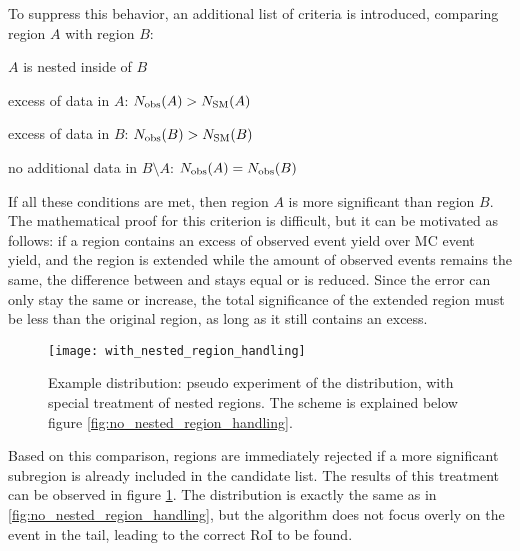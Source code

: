 To suppress this behavior, an additional list of criteria is introduced, comparing region $A$ with region $B$:
\begin{my_list}
	\item $A$ is nested inside of $B$
	\item excess of data in $A$: ${N_\mathrm{obs}}(A) > {N_\mathrm{SM}}(A)$
	\item excess of data in $B$: ${N_\mathrm{obs}}(B) > {N_\mathrm{SM}}(B)$
	\item no additional data in $B \setminus A$: ${N_\mathrm{obs}}(A) = {N_\mathrm{obs}}(B)$
\end{my_list}
If all these conditions are met, then region $A$ is more significant than region $B$.
The mathematical proof for this criterion is difficult, but it can be motivated as follows: if a region contains an excess of observed event yield over MC event yield, and the region is extended while the amount of observed events remains the same, the difference between \Nmc and \Ndata stays equal or is reduced. Since the error \sigmamc can only stay the same or increase, the total significance of the extended region must be less than the original region, as long as it still contains an excess.

\begin{figure}[htb]
	\centering
	\texttt{[image: with\_nested\_region\_handling]}
	\caption{Example distribution: pseudo experiment of the  \sumpT distribution, with special treatment of nested regions. The scheme is explained below figure \ref{fig:no_nested_region_handling}. }
	\label{fig:with_nested_region_handling}
\end{figure}
Based on this comparison, regions are immediately rejected if a more significant subregion is already included in the candidate list. The results of this treatment can be observed in figure \ref{fig:with_nested_region_handling}. The distribution is exactly the same as in \ref{fig:no_nested_region_handling}, but the algorithm does not focus overly on the event in the tail, leading to the correct RoI to be found.

